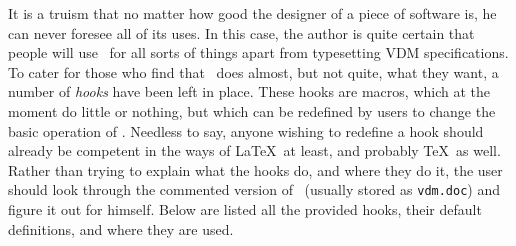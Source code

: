 {It is a truism that no matter how good the designer of a piece of
software is, he can never foresee all of its uses.  In this case, the
author is quite certain that people will use \Vdm\ for all sorts of
things apart from typesetting VDM specifications.  To cater for those
who find that \Vdm\ does almost, but not quite, what they want, a
number of {\em hooks\/} have been left in place.  These hooks are
macros, which at the moment do little or nothing, but which can be
redefined by users to change the basic operation of \Vdm.  Needless to
say, anyone wishing to redefine a hook should already be competent in
the ways of \LaTeX\ at least, and probably \TeX\ as well.  Rather than
trying to explain what the hooks do, and where they do it, the user
should look through the commented version of \Vdm\ (usually stored as
{\tt vdm.doc}) and figure it out for himself.  Below are listed all
the provided hooks, their default definitions, and where they are used.

}
